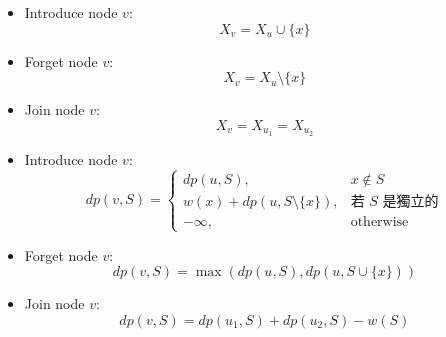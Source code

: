 \documentclass[standalone]{beamer}
\begin{document}
\begin{frame}{}
  \begin{itemize}
    \item Introduce node $v$:
      \[ X_v = X_u \cup \{x\} \]
    \item Forget node $v$:
      \[ X_v = X_u \setminus \{x\} \]
    \item Join node $v$:
      \[ X_v = X_{u_1} = X_{u_2} \]
  \end{itemize}
\end{frame}

\begin{frame}{}
   {
    \begin{itemize}
      \item Introduce node $v$:
         {
          \[ dp(v, S) =
            \begin{cases}
              dp(u, S), & x \notin S \\
              w(x) + dp(u, S \setminus \{x\}), & \text{若 $S$ 是獨立的} \\
              -\infty, & \text{otherwise}
            \end{cases}
          \]
        }
      \item Forget node $v$:
         {
          \[
            dp(v, S) = \max(dp(u, S), dp(u, S \cup \{x\}))
          \]
        }
      \item Join node $v$:
         {
          \[
            dp(v, S) = dp(u_1, S) + dp(u_2, S) - w(S)
          \]
        }
    \end{itemize}
  }
\end{frame}
\end{document}
